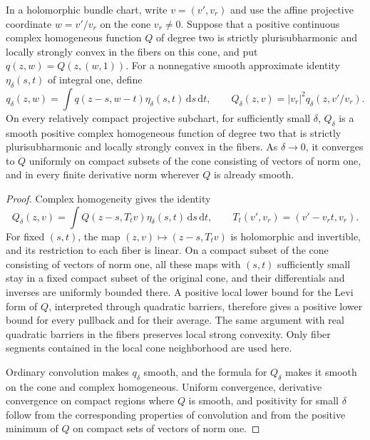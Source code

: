 \begin{lemma}\label{lem:homogeneous-shear-regularization}
In a holomorphic bundle chart, write $v=(v',v_r)$ and use the affine projective coordinate $w=v'/v_r$ on the cone $v_r\ne0$. Suppose that a positive continuous complex homogeneous function $Q$ of degree two is strictly plurisubharmonic and locally strongly convex in the fibers on this cone, and put $q(z,w)=Q(z,(w,1))$. For a nonnegative smooth approximate identity $\eta_\delta(s,t)$ of integral one, define
\[
 q_\delta(z,w)=\int q(z-s,w-t)\eta_\delta(s,t)\,\mathrm ds\,\mathrm dt,
 \qquad Q_\delta(z,v)=|v_r|^2q_\delta(z,v'/v_r).
\]
On every relatively compact projective subchart, for sufficiently small $\delta$, $Q_\delta$ is a smooth positive complex homogeneous function of degree two that is strictly plurisubharmonic and locally strongly convex in the fibers. As $\delta\to0$, it converges to $Q$ uniformly on compact subsets of the cone consisting of vectors of norm one, and in every finite derivative norm wherever $Q$ is already smooth.
\end{lemma}
\begin{proof}
Complex homogeneity gives the identity
\[
 Q_\delta(z,v)
 =\int Q(z-s,T_tv)\eta_\delta(s,t)\,\mathrm ds\,\mathrm dt,
 \qquad T_t(v',v_r)=(v'-v_rt,v_r).
\]
For fixed $(s,t)$, the map $(z,v)\mapsto(z-s,T_tv)$ is holomorphic and invertible, and its restriction to each fiber is linear. On a compact subset of the cone consisting of vectors of norm one, all these maps with $(s,t)$ sufficiently small stay in a fixed compact subset of the original cone, and their differentials and inverses are uniformly bounded there. A positive local lower bound for the Levi form of $Q$, interpreted through quadratic barriers, therefore gives a positive lower bound for every pullback and for their average. The same argument with real quadratic barriers in the fibers preserves local strong convexity. Only fiber segments contained in the local cone neighborhood are used here.

Ordinary convolution makes $q_\delta$ smooth, and the formula for $Q_\delta$ makes it smooth on the cone and complex homogeneous. Uniform convergence, derivative convergence on compact regions where $Q$ is smooth, and positivity for small $\delta$ follow from the corresponding properties of convolution and from the positive minimum of $Q$ on compact sets of vectors of norm one.
\end{proof}


